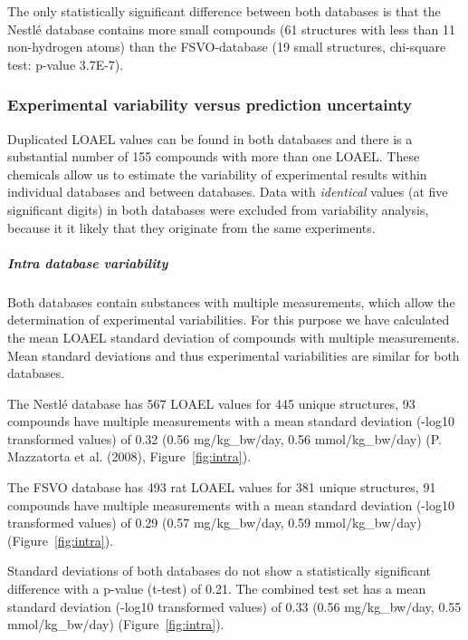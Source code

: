 \documentclass[]{achemso}
\let\oldsubparagraph\subparagraph
\renewcommand{\subparagraph}[1]{\oldsubparagraph{#1}\mbox{}}
\begin{document}
The only statistically significant difference between both databases is
that the Nestlé database contains more small compounds (61 structures
with less than 11 non-hydrogen atoms) than the FSVO-database (19 small
structures, chi-square test: p-value 3.7E-7).

\subsubsection{Experimental variability versus prediction
uncertainty}\label{experimental-variability-versus-prediction-uncertainty}

Duplicated LOAEL values can be found in both databases and there is a
substantial number of 155 compounds with more than one LOAEL. These
chemicals allow us to estimate the variability of experimental results
within individual databases and between databases. Data with
\emph{identical} values (at five significant digits) in both databases
were excluded from variability analysis, because it it likely that they
originate from the same experiments.

\subparagraph{Intra database
variability}\label{intra-database-variability}

Both databases contain substances with multiple measurements, which
allow the determination of experimental variabilities. For this purpose
we have calculated the mean LOAEL standard deviation of compounds with
multiple measurements. Mean standard deviations and thus experimental
variabilities are similar for both databases.

The Nestlé database has 567 LOAEL values for 445 unique structures, 93
compounds have multiple measurements with a mean standard deviation
(-log10 transformed values) of 0.32 (0.56 mg/kg\_bw/day, 0.56
mmol/kg\_bw/day) (P. Mazzatorta et al. (2008), Figure~\ref{fig:intra}).

The FSVO database has 493 rat LOAEL values for 381 unique structures, 91
compounds have multiple measurements with a mean standard deviation
(-log10 transformed values) of 0.29 (0.57 mg/kg\_bw/day, 0.59
mmol/kg\_bw/day) (Figure~\ref{fig:intra}).

Standard deviations of both databases do not show a statistically
significant difference with a p-value (t-test) of 0.21. The combined
test set has a mean standard deviation (-log10 transformed values) of
0.33 (0.56 mg/kg\_bw/day, 0.55 mmol/kg\_bw/day)
(Figure~\ref{fig:intra}).
\end{document}

